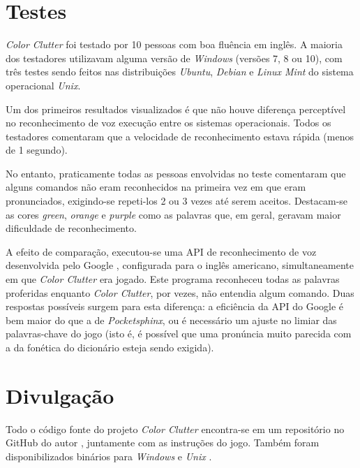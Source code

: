
\section{Testes}

\textit{Color Clutter} foi testado por 10 pessoas com boa fluência em inglês. A maioria dos testadores utilizavam alguma versão de \textit{Windows} (versões 7, 8 ou 10), com três testes sendo feitos nas distribuições \textit{Ubuntu}, \textit{Debian} e \textit{Linux Mint} do sistema operacional \textit{Unix}.

Um dos primeiros resultados visualizados é que não houve diferença perceptível no reconhecimento de voz execução entre os sistemas operacionais. Todos os testadores comentaram que a velocidade de reconhecimento estava rápida (menos de 1 segundo).

No entanto, praticamente todas as pessoas envolvidas no teste comentaram que alguns comandos não eram reconhecidos na primeira vez em que eram pronunciados, exigindo-se repeti-los 2 ou 3 vezes até serem aceitos. Destacam-se as cores \textit{green}, \textit{orange} e \textit{purple} como as palavras que, em geral, geravam maior dificuldade de reconhecimento.

A efeito de comparação, executou-se uma API de reconhecimento de voz desenvolvida pelo Google \citep{googleSpeechAPI}, configurada para o inglês americano, simultaneamente em que \textit{Color Clutter} era jogado. Este programa reconheceu todas as palavras proferidas enquanto \textit{Color Clutter}, por vezes, não entendia algum comando. Duas respostas possíveis surgem para esta diferença: a eficiência da API do Google é bem maior do que a de \textit{Pocketsphinx}, ou é necessário um ajuste no limiar das palavras-chave do jogo (isto é, é possível que uma pronúncia muito parecida com a da fonética do dicionário esteja sendo exigida).


\section{Divulgação}

Todo o código fonte do projeto \textit{Color Clutter} encontra-se em um repositório no GitHub do autor \citep{colorClutterGitHub}, juntamente com as instruções do jogo. Também foram disponibilizados binários para \textit{Windows} e \textit{Unix} \citep{colorClutterDownload}.

